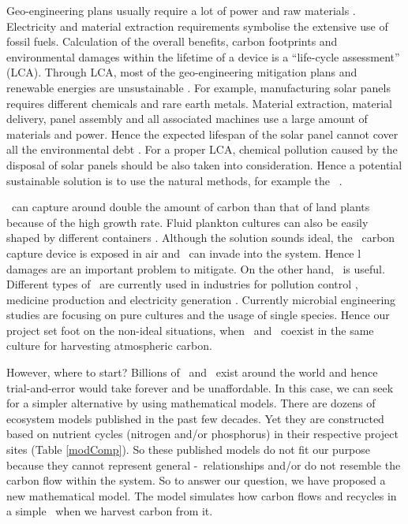 \documentclass[../thesis.tex]{subfiles} %
\begin{document}
Geo-engineering plans usually require a lot of power and raw materials \autocite{boyd2008ranking,boyd2008implications,mcclellan2012cost}.  Electricity and material extraction requirements symbolise the extensive use of fossil fuels.  Calculation of the overall benefits, carbon footprints and environmental damages within the lifetime of a device is a ``life-cycle assessment” (LCA).  Through LCA, most of the geo-engineering mitigation plans and renewable energies are unsustainable \autocite{abdussalam2020green}.  For example, manufacturing solar panels requires different chemicals and rare earth metals.  Material extraction, material delivery, panel assembly and all associated machines use a large amount of materials and power.  Hence the expected lifespan of the solar panel cannot cover all the environmental debt \autocite{martinopoulos2020rooftop}.  For a proper LCA, chemical pollution caused by the disposal of solar panels should be also taken into consideration.  Hence a potential sustainable solution is to use the natural methods, for example the \phy\ \autocite{farrelly2013carbon}.

\Phy\ can capture around double the amount of carbon than that of land plants \autocite{SCHLESINGER2013341} because of the high growth rate.  Fluid plankton cultures can also be easily shaped by different containers \autocite{evanson_2019}.  Although the solution sounds ideal, the \phy\ carbon capture device is exposed in air and \bac\ can invade into the system.  Hence \bac l damages are an important problem to mitigate.  On the other hand, \bac\ is useful.  Different types of \bac\ are currently used in industries for pollution control \autocite{dash2013marine,naik2013lead}, medicine production \autocite{huang2012industrial} and electricity generation \autocite{songera2012electricity}.  Currently microbial engineering studies are focusing on pure cultures and the usage of single species.  Hence our project set foot on the non-ideal situations, when \bac\ and \phy\ coexist in the same culture for harvesting atmospheric carbon.

However, where to start?  Billions of \phy\ and \bac\ exist around the world and hence trial-and-error would take forever and be unaffordable.  In this case, we can seek for a simpler alternative by using mathematical models.  There are dozens of ecosystem models published in the past few decades.  Yet they are constructed based on nutrient cycles (nitrogen and/or phosphorus) in their respective project sites (Table \ref{modComp}).  So these published models do not fit our purpose because they cannot represent general \phy-\bac\ relationships and/or do not resemble the carbon flow within the system.  So to answer our question, we have proposed a new mathematical model.  The model simulates how carbon flows and recycles in a simple \pbs\ when we harvest carbon from it.
\end{document}
